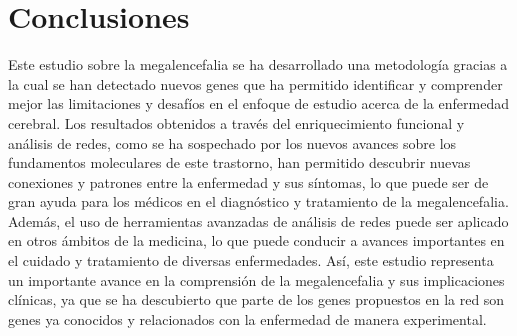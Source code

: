 \section{Conclusiones}

Este estudio sobre la megalencefalia se ha desarrollado una metodología gracias a la cual se han detectado nuevos genes que ha permitido identificar y comprender mejor las limitaciones y desafíos en el enfoque de estudio acerca de la enfermedad cerebral. Los resultados obtenidos a través del enriquecimiento funcional y análisis de redes, como se ha sospechado por los nuevos avances sobre los fundamentos moleculares de este trastorno, han permitido descubrir nuevas conexiones y patrones entre la enfermedad y sus síntomas, lo que puede ser de gran ayuda para los médicos en el diagnóstico y tratamiento de la megalencefalia. Además, el uso de herramientas avanzadas de análisis de redes puede ser aplicado en otros ámbitos de la medicina, lo que puede conducir a avances importantes en el cuidado y tratamiento de diversas enfermedades. Así, este estudio representa un importante avance en la comprensión de la megalencefalia y sus implicaciones clínicas, ya que se ha descubierto que parte de los genes propuestos en la red son genes ya conocidos y relacionados con la enfermedad de manera experimental. 